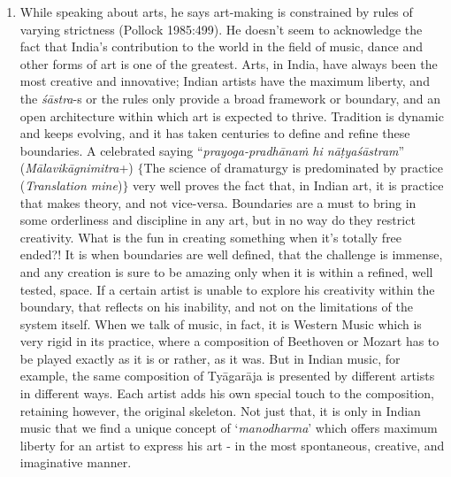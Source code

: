 \begin{enumerate}
\item While speaking about arts, he says art-making is constrained by rules of varying strictness (Pollock 1985:499). He doesn't seem to acknowledge the fact that India's contribution to the world in the field of music, dance and other forms of art is one of the greatest. Arts, in India, have always been the most creative and innovative; Indian artists have the maximum liberty, and the {\it śāstra}-s or the rules only provide a broad framework or boundary, and an open architecture within which art is expected to thrive. Tradition is dynamic and keeps evolving, and it has taken centuries to define and refine these boundaries. A celebrated saying ``\textit{prayoga-pradhānaṁ hi nāṭyaśāstram}'' ({\it Mālavikāgnimitra}+) $\{$The science of dramaturgy is predominated by practice (\textit{Translation mine})$\}$ very well proves the fact that, in Indian art, it is practice that makes theory, and not vice-versa. Boundaries are a must to bring in some orderliness and discipline in any art, but in no way do they restrict creativity. What is the fun in creating something when it's totally free ended?! It is when boundaries are well defined, that the challenge is immense, and any creation is sure to be amazing only when it is within a refined, well tested, space. If a certain artist is unable to explore his creativity within the boundary, that reflects on his inability, and not on the limitations of the system itself. When we talk of music, in fact, it is Western Music which is very rigid in its practice, where a composition of Beethoven or Mozart has to be played exactly as it is or rather, as it was. But in Indian music, for example, the same composition of Tyāgarāja is presented by different artists in different ways. Each artist adds his own special touch to the composition, retaining however, the original skeleton. Not just that, it is only in Indian music that we find a unique concept of `{\it manodharma}' which offers maximum liberty for an artist to express his art - in the most spontaneous, creative, and imaginative manner. 


\end{enumerate}

